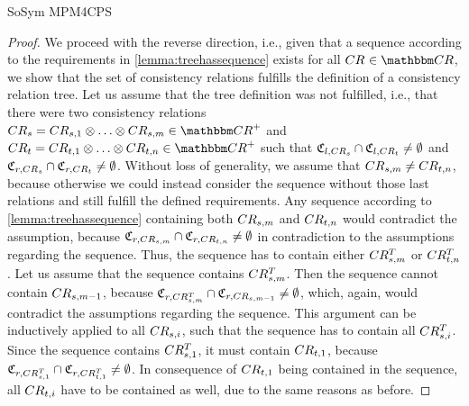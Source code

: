\begin{copiedFrom}{SoSym MPM4CPS}
\begin{proof}
    We proceed with the reverse direction, i.e., given that a sequence according to the requirements in \autoref{lemma:treehassequence} exists for all $\consistencyrelation{CR}{} \in \consistencyrelationset{CR}$, we show that the set of consistency relations fulfills the definition of a consistency relation tree.
    Let us assume that the tree definition was not fulfilled, i.e., that there were two consistency relations $\consistencyrelation{CR}{s} = \consistencyrelation{CR}{s,1} \concat \dots \concat \consistencyrelation{CR}{s,m} \in \transitiveclosure{\consistencyrelationset{CR}}$ and $\consistencyrelation{CR}{t} = \consistencyrelation{CR}{t,1} \concat \dots \concat \consistencyrelation{CR}{t,n} \in \transitiveclosure{\consistencyrelationset{CR}}$ such that $\mathfrak{C}_{l,CR_{s}} \cap \mathfrak{C}_{l,CR_{t}} \neq \emptyset$ and $\mathfrak{C}_{r,CR_{s}} \cap \mathfrak{C}_{r,CR_{t}} \neq \emptyset$.
    Without loss of generality, we assume that $CR_{s,m} \neq CR_{t,n}$, because otherwise we could instead consider the sequence without those last relations and still fulfill the defined requirements.
    Any sequence according to \autoref{lemma:treehassequence} containing both $CR_{s,m}$ and $CR_{t,n}$ would contradict the assumption, because $\mathfrak{C}_{r,CR_{s,m}} \cap \mathfrak{C}_{r,CR_{t,n}} \neq \emptyset$ in contradiction to the assumptions regarding the sequence.
    Thus, the sequence has to contain either $CR^T_{s,m}$ or $CR^T_{t,n}$.
    Let us assume that the sequence contains $CR^T_{s,m}$.
    Then the sequence cannot contain $CR_{s,m-1}$, because $\mathfrak{C}_{r,CR^T_{s,m}} \cap \mathfrak{C}_{r,CR_{s,m-1}} \neq \emptyset$, which, again, would contradict the assumptions regarding the sequence.
    This argument can be inductively applied to all $CR_{s,i}$, such that the sequence has to contain all $CR^T_{s,i}$.
    Since the sequence contains $CR^T_{s,1}$, it must contain $CR_{t,1}$, because $\mathfrak{C}_{r,CR^T_{s,1}} \cap \mathfrak{C}_{r,CR^T_{t,1}} \neq \emptyset$.
    In consequence of $CR_{t,1}$ being contained in the sequence, all $CR_{t,i}$ have to be contained as well, due to the same reasons as before.

\end{proof}
\end{copiedFrom}
